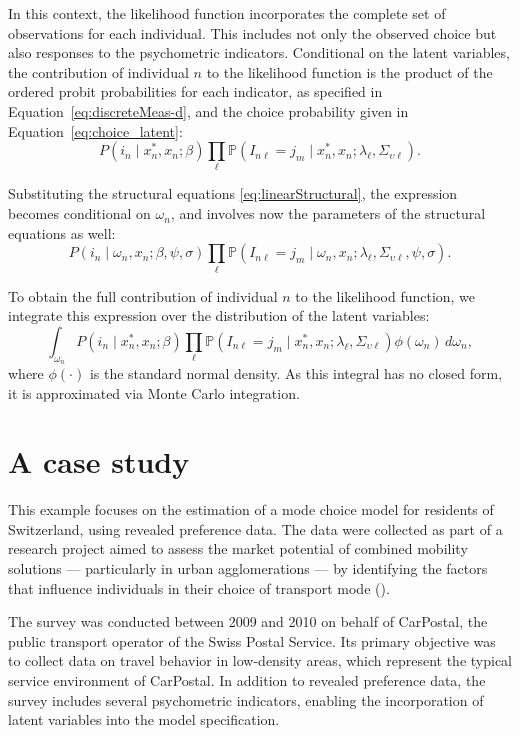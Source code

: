 \documentclass[12pt,a4paper]{article}
\begin{document}
In this context, the likelihood function incorporates the complete set of observations for each individual. This includes not only the observed choice but also responses to the psychometric indicators. Conditional on the latent variables, the contribution of individual \( n \) to the likelihood function is the product of the ordered probit probabilities for each indicator, as specified in Equation~\eqref{eq:discreteMeas-d}, and the choice probability given in Equation~\eqref{eq:choice_latent}:
\[
P(i_n \mid x_n^*, x_n; \beta) \prod_\ell \mathbb{P}(I_{n\ell} = j_m \mid x_n^*, x_n; \lambda_\ell, \Sigma_{\upsilon \ell}).
\]

Substituting the structural equations \eqref{eq:linearStructural}, the expression becomes conditional on \( \omega_n \), and involves now the parameters of the structural equations as well:
\[
P(i_n \mid \omega_n, x_n; \beta, \psi, \sigma) \prod_\ell \mathbb{P}(I_{n\ell} = j_m \mid \omega_n, x_n; \lambda_\ell, \Sigma_{\upsilon \ell}, \psi, \sigma).
\]

To obtain the full contribution of individual \( n \) to the likelihood function, we integrate this expression over the distribution of the latent variables:
\[
\int_{\omega_n} P(i_n \mid x_n^*, x_n; \beta) \prod_\ell \mathbb{P}(I_{n\ell} = j_m \mid x_n^*, x_n; \lambda_\ell, \Sigma_{\upsilon \ell}) \phi(\omega_n) \, d\omega_n,
\]
where \( \phi(\cdot) \) is the standard normal density. As this integral has no closed form, it is approximated via Monte Carlo integration.

\section{A case study}
\label{sec:example}
This example focuses on the estimation of a mode choice model for
residents of Switzerland, using revealed preference data. The data
were collected as part of a research project aimed to assess the market potential
of combined mobility solutions --- particularly in urban agglomerations --- by
identifying the factors that influence individuals in their choice of
transport mode (\cite{OptimaRP2011}).

The survey was conducted between 2009 and 2010 on behalf of CarPostal,
the public transport operator of the Swiss Postal Service. Its primary
objective was to collect data on travel behavior in low-density areas,
which represent the typical service environment of CarPostal. In
addition to revealed preference data, the survey includes several
psychometric indicators, enabling the incorporation of latent
variables into the model specification.
\end{document}
